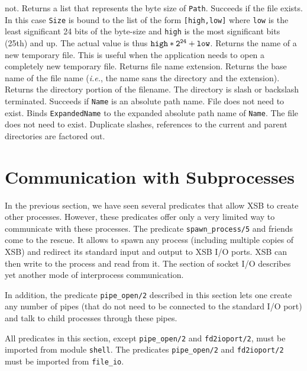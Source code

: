 \begin{description}
  not.
  Returns a list that represents the byte size of {\tt Path}.
  Succeeds if the file exists. In this case {\tt Size} is bound to the list
  of the form {\tt [high,low]} where {\tt low} is the least significant 24
  bits of the byte-size and {\tt high} is the most significant bits (25th)
  and up. The actual value is thus $\tt high*2^{24} + low$.
  Returns the name of a new temporary file. This is useful when the
  application needs to open a completely new temporary file.
  Returns file name extension.
  Returns the base name of the file name ({\it i.e.}, the name sans the
  directory and the extension).
  Returns the directory portion of the filename. The directory is slash or
  backslash terminated.
  Succeeds if {\tt Name} is an absolute path name. File does not need to exist.
  Binds {\tt ExpandedName} to the expanded absolute path name of {\tt Name}.
  The file does not need to exist. Duplicate slashes, references to the
  current and parent directories are factored out.
\end{description}


\section{Communication with Subprocesses}

In the previous section, we have seen several predicates that allow XSB to
create other processes. However, these predicates offer only a very limited
way to communicate with these processes. The predicate
\verb|spawn_process/5| and friends come to the rescue. It allows to spawn
any process (including multiple copies of XSB) and redirect its standard
input and output to XSB I/O ports. XSB can then write to the process and
read from it. The section of socket I/O describes yet another mode of
interprocess communication. 

In addition, the predicate {\tt pipe\_open/2} described in this section
lets one create any number of pipes (that do not need to be connected to
the standard I/O port) and talk to child processes through these pipes.

All predicates in this section, except {\tt pipe\_open/2} and
{\tt fd2ioport/2}, must be imported from module {\tt shell}.
The predicates {\tt pipe\_open/2} and
{\tt fd2ioport/2} must be imported from {\tt file\_io}.

